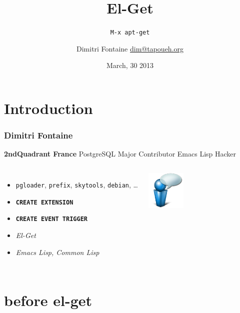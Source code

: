 \documentclass{beamer}
\title{El-Get}
\subtitle{\texttt{M-x apt-get}}
\author{Dimitri Fontaine \url{dim@tapoueh.org}}
\date{March, 30 2013}
\begin{document}
\frame{\titlepage}

\section{Introduction}

\begin{frame}[fragile]
  \frametitle{Dimitri Fontaine}

  \begin{center}
    \textbf{2ndQuadrant France}
    \linebreak
    PostgreSQL Major Contributor
    \linebreak
    Emacs Lisp Hacker
  \end{center}
  \vfill

\begin{columns}[c]

  \begin{itemize}
   \item \texttt{pgloader}, \texttt{prefix}, \texttt{skytools}, \texttt{debian}, …
   \item \texttt{\textbf{CREATE EXTENSION}}
   \item \texttt{\textbf{CREATE EVENT TRIGGER}}
   \item \textit{El-Get}
   \item \textit{Emacs Lisp, Common Lisp}
  \end{itemize}  

\begin{center}
  \includegraphics[height=5em]{bulle-blue-icon.png}
\end{center}
\end{columns}
\end{frame}

\section{before el-get}

\begin{frame}[fragile]


\end{frame}
\end{document}
